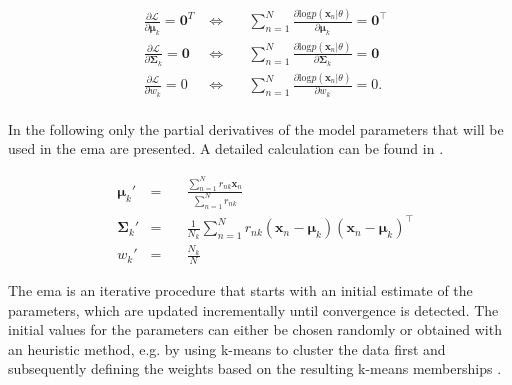 \documentclass[../../../main.tex]{subfiles}
\begin{document}
\begin{equation*}
    \begin{aligned}
    &\frac{\partial{\mathcal{L}}}{\partial{\bm{\mu}_k}} = \bm{0}^T \; &\Longleftrightarrow \quad &\sum\limits_{n=1}^N\frac{\partial{\mathrm{log}p(\bm{x}_n| \theta)}}{\partial{\bm{\mu}_k}} = \bm{0}^\top\\[5pt]
    &\frac{\partial{\mathcal{L}}}{\partial{\bm{\Sigma}_k}} = \bm{0} \; &\Longleftrightarrow \quad &\sum\limits_{n=1}^N\frac{\partial{\mathrm{log}p(\bm{x}_n| \theta)}}{\partial{\bm{\Sigma}_k}} = \bm{0}\\[5pt]
    &\frac{\partial{\mathcal{L}}}{\partial{w_k}} = 0 \; &\Longleftrightarrow \quad &\sum\limits_{n=1}^N\frac{\partial{\mathrm{log}p(\bm{x}_n| \theta)}}{\partial{w_k}} = 0.\\
    \end{aligned}
\end{equation*}

In the following only the partial derivatives of the model parameters that will be used in the \acrshort{ema} are presented. A detailed calculation can be found in \cite[pp.319]{dei_2020}.

\begin{equation}\label{eq:ml_estimator}
    \begin{aligned}
    &\bm{\mu}_k' &= \quad &\frac{\sum_{n=1}^N r_{nk}\bm{x}_n}{\sum_{n=1}^N r_{nk}} \\
    &\bm{\Sigma}_k' &= \quad &\frac{1}{N_k}\sum_{n=1}^N r_{nk}(\bm{x}_n-\bm{\mu}_k)(\bm{x}_n-\bm{\mu}_k)^\top\\
    &w_k' &= \quad &\frac{N_k}{N}
    \end{aligned}
\end{equation}


The \acrshort{ema} is an iterative procedure that starts with an initial estimate of the parameters, which are updated incrementally until convergence is detected. The initial values for the parameters can either be chosen randomly or obtained with an heuristic method, e.g. by using k-means to cluster the data first and subsequently defining the weights based on the resulting k-means memberships \cite[pp. 325]{dei_2020}. 
\end{document}
